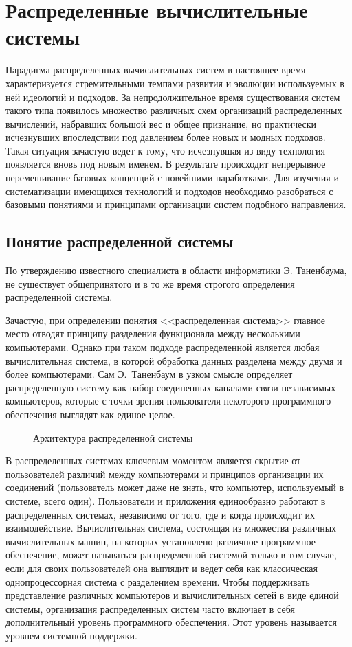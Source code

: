 \updateStamp
{}
\section{Распределенные вычислительные системы}
Парадигма распределенных вычислительных систем в настоящее время характеризуется стремительными темпами развития и эволюции используемых в ней идеологий и подходов. За непродолжительное время существования систем такого типа появилось множество различных схем организаций распределенных вычислений, набравших большой вес и общее признание, но практически исчезнувших впоследствии под давлением более новых и модных подходов. Такая ситуация зачастую ведет к тому, что исчезнувшая из виду технология появляется вновь под новым именем. В результате происходит непрерывное перемешивание базовых концепций с новейшими наработками. Для изучения и систематизации имеющихся технологий и подходов необходимо разобраться с базовыми понятиями и принципами организации систем подобного направления. 

\subsection{Понятие распределенной системы}
По утверждению известного специалиста в области информатики Э. Таненбаума, не существует общепринятого и в то же время строгого определения распределенной системы. 

Зачастую, при определении понятия <<распределенная система>> главное место отводят принципу разделения функционала между несколькими компьютерами. Однако при таком подходе распределенной является любая вычислительная система, в которой обработка данных разделена между двумя и более компьютерами. Сам Э.~Таненбаум в узком смысле определяет распределенную систему как набор соединенных каналами связи независимых компьютеров, которые с точки зрения пользователя некоторого программного обеспечения выглядят как единое целое.

\begin{figure}[h]
\caption{Архитектура распределенной системы}
\label{0:dcs}
\end{figure}

В распределенных системах ключевым моментом является скрытие от пользователей различий между компьютерами и принципов организации их соединений (пользователь может даже не знать, что компьютер, используемый в системе, всего один). Пользователи и приложения единообразно работают в распределенных системах, независимо от того, где и когда происходит их взаимодействие. Вычислительная система, состоящая из множества различных вычислительных машин, на которых установлено различное программное обеспечение, может называться распределенной системой только в том случае, если для своих пользователей она выглядит и ведет себя как классическая однопроцессорная система с разделением времени. Чтобы поддерживать представление различных компьютеров и вычислительных сетей в виде единой системы, организация распределенных систем часто включает в себя дополнительный уровень программного обеспечения. Этот уровень называется уровнем системной поддержки.

